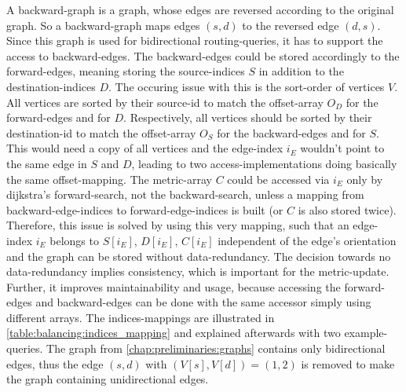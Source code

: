         A backward-graph is a graph, whose edges are reversed according to the original graph.
        So a backward-graph maps edges $(s, d)$ to the reversed edge $(d, s)$.
        Since this graph is used for bidirectional routing-queries, it has to support the access to backward-edges.
        The backward-edges could be stored accordingly to the forward-edges, meaning storing the source-indices $S$ in addition to the destination-indices $D$.
        The occuring issue with this is the sort-order of vertices $V$.
        All vertices are sorted by their source-id to match the offset-array $O_D$ for the forward-edges and for $D$.
        Respectively, all vertices should be sorted by their destination-id to match the offset-array $O_S$ for the backward-edges and for $S$.
        This would need a copy of all vertices and the edge-index $i_E$ wouldn't point to the same edge in $S$ and $D$, leading to two access-implementations doing basically the same offset-mapping.
        The \gls{metric}-array $C$ could be accessed via $i_E$ only by \gls{dijkstra}'s forward-search, not the backward-search, unless a mapping from backward-edge-indices to forward-edge-indices is built (or $C$ is also stored twice).
        Therefore, this issue is solved by using this very mapping, such that an edge-index $i_E$ belongs to $S[i_E]$, $D[i_E]$, $C[i_E]$ independent of the edge's orientation and the graph can be stored without data-redundancy.
        The decision towards no data-redundancy implies consistency, which is important for the \gls{metric}-update.
        Further, it improves maintainability and usage, because accessing the forward-edges and backward-edges can be done with the same accessor simply using different arrays.
        The indices-mappings are illustrated in \cref{table:balancing:indices_mapping} and explained afterwards with two example-queries.
        The graph from \cref{chap:preliminaries:graphs} contains only bidirectional edges, thus the edge $(s, d)$ with $(V[s], V[d])=(1, 2)$ is removed to make the graph containing unidirectional edges.

